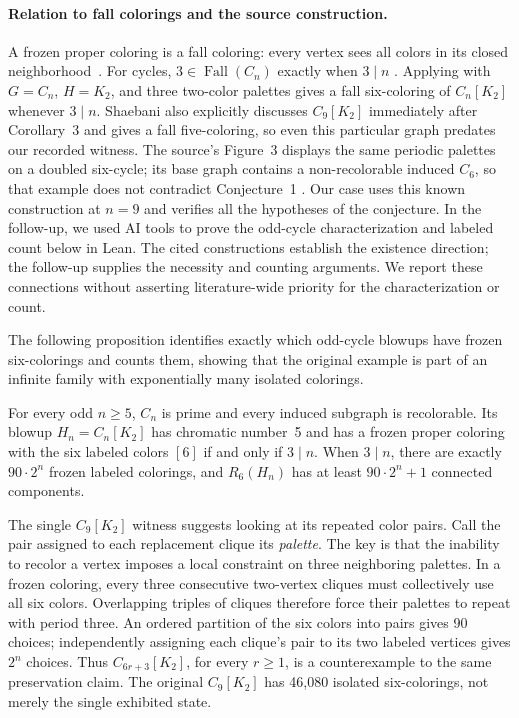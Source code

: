\paragraph{Relation to fall colorings and the source construction.}
A frozen proper coloring is a fall coloring: every vertex sees all colors in its closed neighborhood~\citep{dunbar2000fall}.
For cycles, $3\in\operatorname{Fall}(C_n)$ exactly when $3\mid n$ \citep[Section~4]{lauri2019fall}.
Applying \citet[Theorem~2]{shaebani2009fall} with $G=C_n$, $H=K_2$, and three two-color palettes gives a fall six-coloring of $C_n[K_2]$ whenever $3\mid n$.
Shaebani also explicitly discusses $C_9[K_2]$ immediately after Corollary~3 and gives a fall five-coloring, so even this particular graph predates our recorded witness.
The source's Figure~3 displays the same periodic palettes on a doubled six-cycle; its base graph contains a non-recolorable induced $C_6$, so that example does not contradict Conjecture~1 \citep[Section~6]{belavadi2026recoloring}.
Our case uses this known construction at $n=9$ and verifies all the
hypotheses of the conjecture. In the follow-up, we used AI tools to
prove the odd-cycle characterization and labeled count below in Lean.
The cited constructions establish the existence direction; the
follow-up supplies the necessity and counting arguments. We report these
connections without asserting literature-wide priority for the
characterization or count.

The following proposition identifies exactly which odd-cycle blowups
have frozen six-colorings and counts them, showing that the original example is part of an
infinite family with exponentially many isolated colorings.

\begin{structuralproposition}
\label{prop:cycle-blowup-frozen}
For every odd $n\ge5$, $C_n$ is prime and every induced subgraph is
recolorable. Its blowup $H_n=C_n[K_2]$ has chromatic number~5 and has
a frozen proper coloring with the six labeled colors $[6]$ if and only
if $3\mid n$. When $3\mid n$, there are exactly $90\cdot2^n$ frozen
labeled colorings, and $R_6(H_n)$ has at least $90\cdot2^n+1$ connected
components.
\end{structuralproposition}

The single $C_9[K_2]$ witness suggests looking at its repeated color
pairs. Call the pair assigned to each replacement clique its
\emph{palette}. The key is that the inability to recolor a vertex
imposes a local constraint on three neighboring palettes. In a frozen
coloring, every three consecutive two-vertex cliques must collectively
use all six colors. Overlapping triples of cliques therefore force
their palettes to repeat with period three. An ordered partition of the six
colors into pairs gives 90 choices; independently assigning each
clique's pair to its two labeled vertices gives $2^n$ choices.
Thus $C_{6r+3}[K_2]$, for every
$r\ge1$, is a counterexample to the same preservation claim. The
original $C_9[K_2]$ has 46,080 isolated six-colorings, not merely the
single exhibited state.

